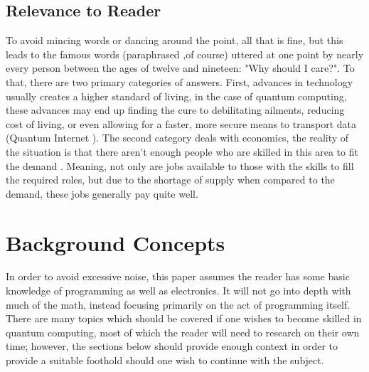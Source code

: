 \documentclass[a4paper]{article}
\begin{document}
\subsection{Relevance to Reader} %
To avoid mincing words or dancing around the point, all that is fine, but this leads to the famous words (paraphrased ,of course) uttered at one point by nearly every person between the ages of twelve and nineteen: "Why should I care?".  To that, there are two primary categories of answers.  First, advances in technology usually creates a higher standard of living, in the case of quantum computing, these advances may end up finding the cure to debilitating ailments, reducing cost of living, or even allowing for a faster, more secure means to transport data (Quantum Internet \cite{qinternetNature}).  The second category deals with economics, the reality of the situation is that there aren't enough people who are skilled in this area to fit the demand \cite{qc5ycommercialize}.  Meaning, not only are jobs available to those with the skills to fill the required roles, but due to the shortage of supply when compared to the demand, these jobs generally pay quite well. 


\section{Background Concepts}
\label{sec:backgroundconcepts}
In order to avoid excessive noise, this paper assumes the reader has some basic knowledge of programming as well as electronics.  It will not go into depth with much of the math, instead focusing primarily on the act of programming itself.  There are many topics which should be covered if one wishes to become skilled in quantum computing, most of which the reader will need to research on their own time; however, the sections below should provide enough context in order to provide a suitable foothold should one wish to continue with the subject.
\end{document}
